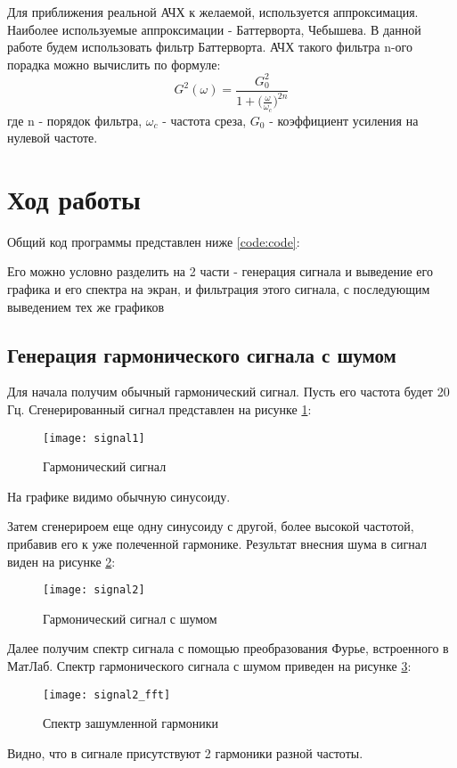 Для приближения реальной АЧХ к желаемой, используется аппроксимация. Наиболее используемые аппроксимации - Баттерворта, Чебышева. В данной работе будем использовать фильтр Баттерворта. АЧХ такого фильтра n-ого порадка можно вычислить по формуле:
\begin{equation}
	G^2(\omega) = \frac{G^2_0}{1 + \big( \frac{\omega}{\omega _c} \big) ^{2n}}
\end{equation}
где n - порядок фильтра, $\omega _c$ - частота среза, $G_0$ - коэффициент усиления на нулевой частоте.

\section{Ход работы}
Общий код программы представлен ниже \ref{code:code}:

\parindent=1cm
Его можно условно разделить на 2 части - генерация сигнала и выведение его графика и его спектра на экран, и фильтрация этого сигнала, с последующим выведением тех же графиков

\subsection{Генерация гармонического сигнала с шумом}
Для начала получим обычный гармонический сигнал. Пусть его частота будет 20 Гц. Сгенерированный сигнал представлен на рисунке \ref{pic:signal1}:
\begin{figure}[H]
	\begin{center}
		\texttt{[image: signal1]}
		\caption{Гармонический сигнал} 
		\label{pic:signal1} %
	\end{center}
\end{figure}
На графике видимо обычную синусоиду.

Затем сгенерироем еще одну синусоиду с другой, более высокой частотой, прибавив его к уже полеченной гармонике. Результат внесния шума в сигнал виден на рисунке \ref{pic:signal2}:
\begin{figure}[H]
	\begin{center}
		\texttt{[image: signal2]}
		\caption{Гармонический сигнал с шумом} 
		\label{pic:signal2} %
	\end{center}
\end{figure}

Далее получим спектр сигнала с помощью преобразования Фурье, встроенного в МатЛаб. Спектр гармонического сигнала с шумом приведен на рисунке \ref{pic:signal2_fft}:
\begin{figure}[H]
	\begin{center}
		\texttt{[image: signal2\_fft]}
		\caption{Спектр зашумленной гармоники} 
		\label{pic:signal2_fft} %
	\end{center}
\end{figure}
Видно, что в сигнале присутствуют 2 гармоники разной частоты.

